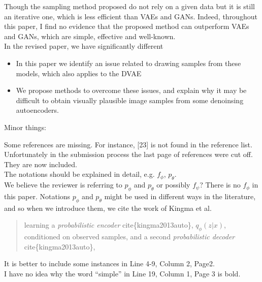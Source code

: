 \documentclass{article}
\begin{document}
{\color{blue}
Though the sampling method proposed do not rely on a given data but it is still an iterative one, which is less efficient than VAEs and GANs. Indeed, throughout this paper, I find no evidence that the proposed method can outperform VAEs and GANs, which are simple, effective and well-known.}\\

In the revised paper, we have significantly different 
\begin{itemize}
    \item In this paper we identify an issue related to drawing samples from these models, which also applies to the DVAE
    \item We propose methods to overcome these issues, and explain why it may be difficult to obtain visually plausible image samples from some denoinsing autoencoders.
\end{itemize}


Minor things: \newline

{\color{blue}
Some references are missing. For instance, [23] is not found in the reference list.}\\

Unfortunately in the submission process the last page of references were cut off. They are now included.\\

{\color{blue}
The notations should be explained in detail, e.g. $f_\phi$, $p_\theta$.} \\

We believe the reviewer is referring to $p_\phi$ and $p_\theta$ or possibly $f_\psi$? There is no $f_\phi$ in this paper. Notations $p_\phi$ and $p_\theta$ might be used in different ways in the literature, and so when we introduce them, we cite the work of Kingma et al.\\

\begin{quote}
    learning a \textit{probabilistic encoder} cite\{kingma2013auto\}, $q_\phi(z|x)$, conditioned on observed samples, and a second \textit{probabilistic decoder} cite\{kingma2013auto\},
\end{quote} 

{\color{blue}
It is better to include some instances in Line 4-9, Column 2, Page2.}\\

{\color{blue}
I have no idea why the word “simple” in Line 19, Column 1, Page 3 is bold.}\newline
\end{document}

